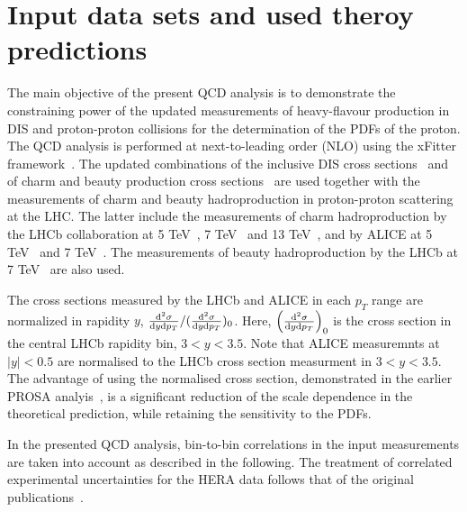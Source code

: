 \documentclass[12pt]{article}
\begin{document}
\section{Input data sets and used theroy predictions}
\label{sec:qcdanalysis}

The main objective of the present QCD analysis is to demonstrate the constraining power of the updated measurements of 
heavy-flavour production in DIS and proton-proton collisions for the determination of the PDFs of the proton. 
The QCD analysis is performed at next-to-leading order (NLO) using the xFitter framework~\cite{Alekhin:2014irh}. 
The updated combinations of the inclusive DIS cross sections~\cite{Abramowicz:2015mha} and of charm and beauty production cross sections~\cite{H1:2018flt} are used together with the measurements of charm and beauty hadroproduction in proton-proton scattering at the LHC. The latter include the measurements of charm hadroproduction by the LHCb collaboration at 5 TeV~\cite{Aaij:2016jht}, 7 TeV~\cite{Aaij:2013mga} and 13 TeV~\cite{Aaij:2015bpa}, and by ALICE at 5 TeV~\cite{Acharya:2019mgn} and 7 TeV~\cite{Acharya:2017jgo}. The measurements of beauty hadroproduction by the LHCb at 7 TeV~\cite{Aaij:2013noa} are also used.

The cross sections measured by the LHCb and ALICE in each $p_T$ range are normalized in rapidity $y$, $\frac{{\rm d}^2\sigma}{{\rm d}y{\rm d}p_T} / (\frac{{\rm d}^2\sigma}{{\rm d}y{\rm d}p_T})_{0}$. Here, $\left(\frac{{\rm d}^2\sigma}{{\rm d}y{\rm d}p_T}\right)_{0}$ is the cross section in the central LHCb rapidity bin, $3 < y < 3.5$. 
Note that ALICE measuremnts at $|y| < 0.5$ are normalised to the LHCb cross section measurment in $3 < y < 3.5$. 
The advantage of using the normalised cross section, demonstrated in the earlier PROSA analyis~\cite{Zenaiev:2015rfa}, 
is a significant reduction of the scale dependence in the theoretical prediction,  while retaining the sensitivity to 
the PDFs. 

In the presented QCD analysis, bin-to-bin correlations in the input measurements are taken into account as described in the following. The treatment of correlated experimental uncertainties for the HERA data follows that of the original publications~\cite{Abramowicz:2015mha,H1:2018flt}.
 
\end{document}

